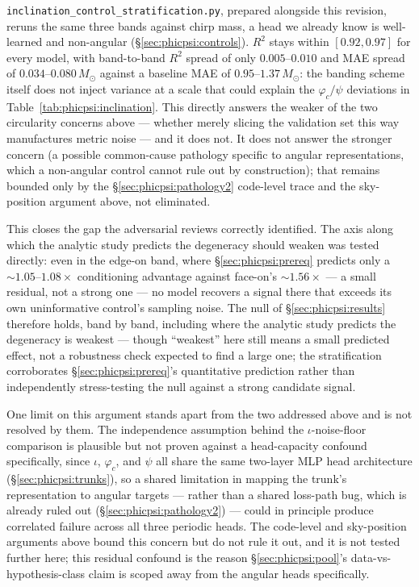 \texttt{inclination\_control\_stratification.py}, prepared alongside this revision, reruns the same three bands against chirp mass, a head we already know is well-learned and non-angular (\S\ref{sec:phicpsi:controls}).
$R^2$ stays within $[0.92, 0.97]$ for every model, with band-to-band $R^2$ spread of only $0.005$--$0.010$ and MAE spread of $0.034$--$0.080\,M_\odot$ against a baseline MAE of $0.95$--$1.37\,M_\odot$: the banding scheme itself does not inject variance at a scale that could explain the $\varphi_c/\psi$ deviations in Table~\ref{tab:phicpsi:inclination}.
This directly answers the weaker of the two circularity concerns above --- whether merely slicing the validation set this way manufactures metric noise --- and it does not.
It does not answer the stronger concern (a possible common-cause pathology specific to angular representations, which a non-angular control cannot rule out by construction); that remains bounded only by the \S\ref{sec:phicpsi:pathology2} code-level trace and the sky-position argument above, not eliminated.

This closes the gap the adversarial reviews correctly identified.
The axis along which the analytic study predicts the degeneracy should weaken was tested directly: even in the edge-on band, where \S\ref{sec:phicpsi:prereq} predicts only a $\sim 1.05$--$1.08\times$ conditioning advantage against face-on's $\sim 1.56\times$ --- a small residual, not a strong one --- no model recovers a signal there that exceeds its own uninformative control's sampling noise.
The null of \S\ref{sec:phicpsi:results} therefore holds, band by band, including where the analytic study predicts the degeneracy is weakest --- though ``weakest'' here still means a small predicted effect, not a robustness check expected to find a large one; the stratification corroborates \S\ref{sec:phicpsi:prereq}'s quantitative prediction rather than independently stress-testing the null against a strong candidate signal.

One limit on this argument stands apart from the two addressed above and is not resolved by them.
The independence assumption behind the $\iota$-noise-floor comparison is plausible but not proven against a head-capacity confound specifically, since $\iota$, $\varphi_c$, and $\psi$ all share the same two-layer MLP head architecture (\S\ref{sec:phicpsi:trunks}), so a shared limitation in mapping the trunk's representation to angular targets --- rather than a shared loss-path bug, which is already ruled out (\S\ref{sec:phicpsi:pathology2}) --- could in principle produce correlated failure across all three periodic heads.
The code-level and sky-position arguments above bound this concern but do not rule it out, and it is not tested further here; this residual confound is the reason \S\ref{sec:phicpsi:pool}'s data-vs-hypothesis-class claim is scoped away from the angular heads specifically.


